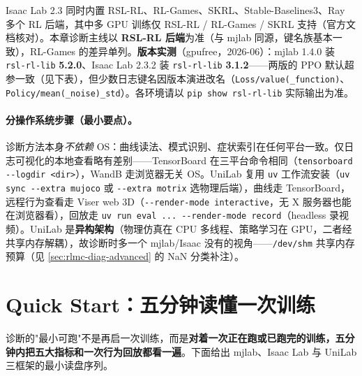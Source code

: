 \begin{note}
Isaac Lab 2.3 同时内置 RSL-RL、RL-Games、SKRL、Stable-Baselines3、Ray 多个 RL 后端，其中多 GPU 训练仅 RSL-RL / RL-Games / SKRL 支持（官方文档核对）。本章诊断主线以 \textbf{RSL-RL 后端}为准（与 mjlab 同源，键名族基本一致），RL-Games 的差异单列。\textbf{版本实测}（gpufree，2026-06）：mjlab 1.4.0 装 \texttt{rsl-rl-lib} \textbf{5.2.0}、Isaac Lab 2.3.2 装 \texttt{rsl-rl-lib} \textbf{3.1.2}——两版的 PPO 默认超参一致（见下表），但少数日志键名因版本演进改名（\verb|Loss/value(_function)|、\verb|Policy/mean(_noise)_std|）。各环境请以 \texttt{pip show rsl-rl-lib} 实际输出为准。
\end{note}

\paragraph{分操作系统步骤（最小要点）。}诊断方法本身\emph{不依赖} OS：曲线读法、模式识别、症状索引在任何平台一致。仅日志可视化的本地查看略有差别——TensorBoard 在三平台命令相同（\verb|tensorboard --logdir <dir>|），WandB 走浏览器无关 OS。UniLab 复用 \verb|uv| 工作流安装（\verb|uv sync --extra mujoco| 或 \verb|--extra motrix| 选物理后端），曲线走 TensorBoard，远程行为查看走 Viser web 3D（\verb|--render-mode interactive|，无 X 服务器也能在浏览器看），回放走 \verb|uv run eval ... --render-mode record|（headless 录视频）。UniLab 是\textbf{异构架构}（物理仿真在 CPU 多线程、策略学习在 GPU，二者经共享内存解耦），故诊断时多一个 mjlab/Isaac 没有的视角——\verb|/dev/shm| 共享内存预算（见 \cref{sec:rlmc-diag-advanced} 的 NaN 分类补注）。

\section*{Quick Start：五分钟读懂一次训练}
\label{sec:rlmc-diag-quickstart}

诊断的"最小可跑"不是再启一次训练，而是\textbf{对着一次正在跑或已跑完的训练，五分钟内把五大指标和一次行为回放都看一遍}。下面给出 mjlab、Isaac Lab 与 UniLab 三框架的最小读盘序列。

